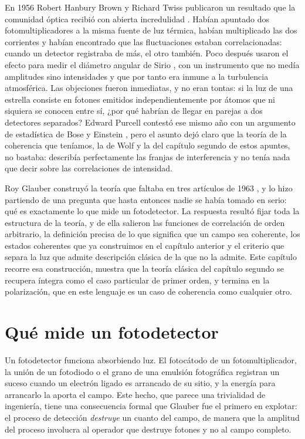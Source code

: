     En 1956 Robert Hanbury Brown y Richard Twiss publicaron un resultado que la comunidad óptica recibió con abierta incredulidad \citep{hanburybrown1956correlation}. Habían apuntado dos fotomultiplicadores a la misma fuente de luz térmica, habían multiplicado las dos corrientes y habían encontrado que las fluctuaciones estaban correlacionadas: cuando un detector registraba de más, el otro también. Poco después usaron el efecto para medir el diámetro angular de Sirio \citep{hanburybrown1956test}, con un instrumento que no medía amplitudes sino intensidades y que por tanto era inmune a la turbulencia atmosférica. Las objeciones fueron inmediatas, y no eran tontas: si la luz de una estrella consiste en fotones emitidos independientemente por átomos que ni siquiera se conocen entre sí, ¿por qué habrían de llegar en parejas a dos detectores separados? Edward Purcell contestó ese mismo año con un argumento de estadística de Bose y Einstein \citep{purcell1956question}, pero el asunto dejó claro que la teoría de la coherencia que teníamos, la de Wolf y la del capítulo segundo de estos apuntes, no bastaba: describía perfectamente las franjas de interferencia y no tenía nada que decir sobre las correlaciones de intensidad.

    Roy Glauber construyó la teoría que faltaba en tres artículos de 1963 \citep{glauber1963photon, glauber1963quantum}, y lo hizo partiendo de una pregunta que hasta entonces nadie se había tomado en serio: qué es exactamente lo que mide un fotodetector. La respuesta resultó fijar toda la estructura de la teoría, y de ella salieron las funciones de correlación de orden arbitrario, la definición precisa de lo que significa que un campo sea coherente, los estados coherentes que ya construimos en el capítulo anterior y el criterio que separa la luz que admite descripción clásica de la que no la admite. Este capítulo recorre esa construcción, muestra que la teoría clásica del capítulo segundo se recupera íntegra como el caso particular de primer orden, y termina en la polarización, que en este lenguaje es un caso de coherencia como cualquier otro.

\section{Qué mide un fotodetector}

    Un fotodetector funciona absorbiendo luz. El fotocátodo de un fotomultiplicador, la unión de un fotodiodo o el grano de una emulsión fotográfica registran un suceso cuando un electrón ligado es arrancado de su sitio, y la energía para arrancarlo la aporta el campo. Este hecho, que parece una trivialidad de ingeniería, tiene una consecuencia formal que Glauber fue el primero en explotar: el proceso de detección \textit{destruye} un cuanto del campo, de manera que la amplitud del proceso involucra al operador que destruye fotones y no al campo completo.

